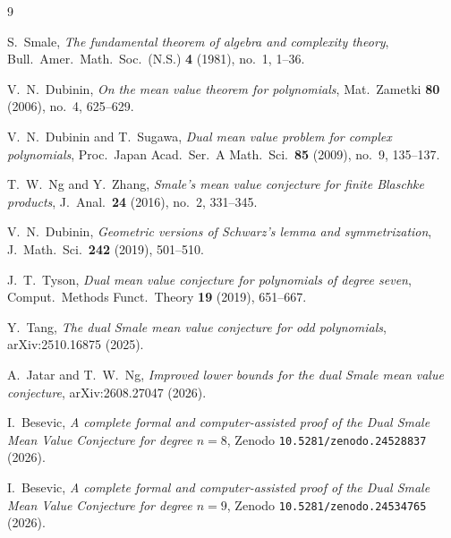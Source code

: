 \documentclass[11pt,a4paper]{article}
\theoremstyle{definition}
\theoremstyle{remark}
\begin{document}
\begin{thebibliography}{9}

S.~Smale,
\emph{The fundamental theorem of algebra and complexity theory},
Bull.\ Amer.\ Math.\ Soc.\ (N.S.) \textbf{4} (1981), no.~1, 1--36.

V.~N.~Dubinin,
\emph{On the mean value theorem for polynomials},
Mat.\ Zametki \textbf{80} (2006), no.~4, 625--629.

V.~N.~Dubinin and T.~Sugawa,
\emph{Dual mean value problem for complex polynomials},
Proc.\ Japan Acad.\ Ser.\ A Math.\ Sci.\ \textbf{85} (2009), no.~9, 135--137.

T.~W.~Ng and Y.~Zhang,
\emph{Smale's mean value conjecture for finite Blaschke products},
J.\ Anal.\ \textbf{24} (2016), no.~2, 331--345.

V.~N.~Dubinin,
\emph{Geometric versions of Schwarz's lemma and symmetrization},
J.\ Math.\ Sci.\ \textbf{242} (2019), 501--510.

J.~T.~Tyson,
\emph{Dual mean value conjecture for polynomials of degree seven},
Comput.\ Methods Funct.\ Theory \textbf{19} (2019), 651--667.

Y.~Tang,
\emph{The dual Smale mean value conjecture for odd polynomials},
arXiv:2510.16875 (2025).

A.~Jatar and T.~W.~Ng,
\emph{Improved lower bounds for the dual Smale mean value conjecture},
arXiv:2608.27047 (2026).

I.~Besevic,
\emph{A complete formal and computer-assisted proof of the Dual Smale Mean Value Conjecture for degree $n = 8$},
Zenodo \texttt{10.5281/zenodo.24528837} (2026).

I.~Besevic,
\emph{A complete formal and computer-assisted proof of the Dual Smale Mean Value Conjecture for degree $n = 9$},
Zenodo \texttt{10.5281/zenodo.24534765} (2026).

\end{thebibliography}
\end{document}
